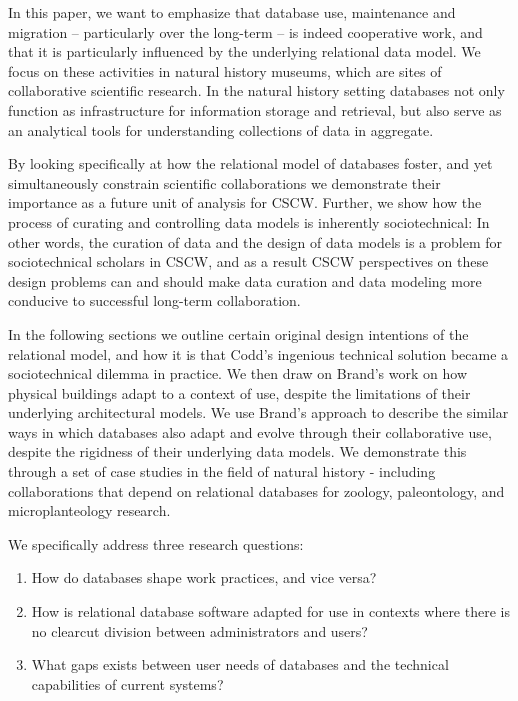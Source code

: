 In this paper, we want to emphasize that database use, maintenance and migration – particularly over the long-term – is indeed cooperative work, and that it is particularly influenced by the underlying relational data model. We focus on these activities in natural history museums, which are sites of collaborative scientific research. In the natural history setting databases not only function as infrastructure for information storage and retrieval, but also serve as an analytical tools for understanding collections of data in aggregate. 

By looking specifically at how the relational model of databases foster, and yet simultaneously constrain scientific collaborations we demonstrate their importance as a future unit of analysis for CSCW. Further, we show how the process of curating and controlling data models is inherently sociotechnical: In other words, the curation of data and the design of data models is a problem for sociotechnical scholars in CSCW, and as a result CSCW perspectives on these design problems can and should make data curation and data modeling more conducive to successful long-term collaboration. 

In the following sections we outline certain original design intentions of the relational model, and how it is that Codd's ingenious technical solution became a sociotechnical dilemma in practice. We then draw on Brand's work on how physical buildings adapt to a context of use, despite the limitations of their underlying architectural models. We use Brand's approach to describe the similar ways in which databases also adapt and evolve through their collaborative use, despite the rigidness of their underlying data models. We demonstrate this through a set of case studies in the field of natural history - including collaborations that depend on relational databases for zoology, paleontology, and microplanteology research.  

We specifically address three research questions: 

\begin{enumerate}
\item How do databases shape work practices, and vice versa?
\item How is relational database software adapted for use in contexts where there is no clearcut division between administrators and users?
\item What gaps exists between user needs of databases and the technical capabilities of current systems?
\end{enumerate}